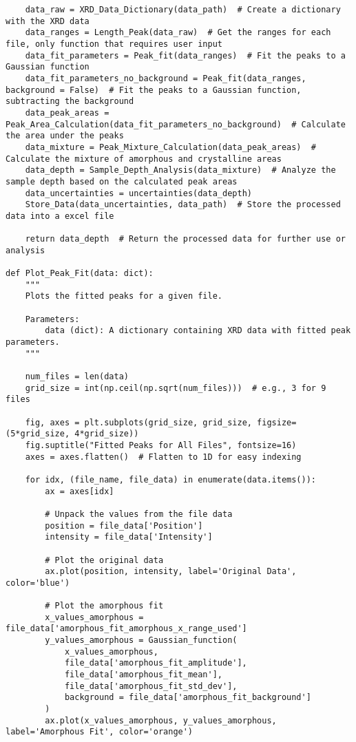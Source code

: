 \begin{small}
\begin{verbatim}
    data_raw = XRD_Data_Dictionary(data_path)  # Create a dictionary with the XRD data
    data_ranges = Length_Peak(data_raw)  # Get the ranges for each file, only function that requires user input
    data_fit_parameters = Peak_fit(data_ranges)  # Fit the peaks to a Gaussian function
    data_fit_parameters_no_background = Peak_fit(data_ranges, background = False)  # Fit the peaks to a Gaussian function, subtracting the background
    data_peak_areas = Peak_Area_Calculation(data_fit_parameters_no_background)  # Calculate the area under the peaks
    data_mixture = Peak_Mixture_Calculation(data_peak_areas)  # Calculate the mixture of amorphous and crystalline areas
    data_depth = Sample_Depth_Analysis(data_mixture)  # Analyze the sample depth based on the calculated peak areas
    data_uncertainties = uncertainties(data_depth)
    Store_Data(data_uncertainties, data_path)  # Store the processed data into a excel file

    return data_depth  # Return the processed data for further use or analysis

def Plot_Peak_Fit(data: dict):
    """
    Plots the fitted peaks for a given file.

    Parameters:
        data (dict): A dictionary containing XRD data with fitted peak parameters.
    """ 

    num_files = len(data)
    grid_size = int(np.ceil(np.sqrt(num_files)))  # e.g., 3 for 9 files

    fig, axes = plt.subplots(grid_size, grid_size, figsize=(5*grid_size, 4*grid_size))
    fig.suptitle("Fitted Peaks for All Files", fontsize=16)
    axes = axes.flatten()  # Flatten to 1D for easy indexing

    for idx, (file_name, file_data) in enumerate(data.items()):
        ax = axes[idx]

        # Unpack the values from the file data
        position = file_data['Position']
        intensity = file_data['Intensity']

        # Plot the original data
        ax.plot(position, intensity, label='Original Data', color='blue')

        # Plot the amorphous fit
        x_values_amorphous = file_data['amorphous_fit_amorphous_x_range_used']
        y_values_amorphous = Gaussian_function(
            x_values_amorphous,
            file_data['amorphous_fit_amplitude'],
            file_data['amorphous_fit_mean'],
            file_data['amorphous_fit_std_dev'],
            background = file_data['amorphous_fit_background']
        )
        ax.plot(x_values_amorphous, y_values_amorphous, label='Amorphous Fit', color='orange')


\end{verbatim}
\end{small}
